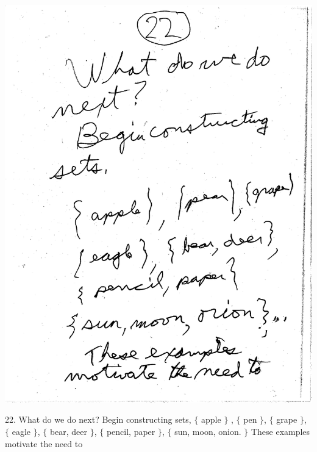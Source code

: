 \documentclass[10pt,a4paper]{article}
\begin{document}
\vspace{.20 in}

\includegraphics[scale=.5]{Pages/Page_22}

22. What do we do next? Begin constructing sets, $\{$ apple $\}$ , $\{$ pen $\}$, $\{$ grape $\}$, $\{$ eagle $\}$, $\{$ bear, deer $\}$, $\{$ pencil, paper $\}$, $\{$ sun, moon, onion. $\}$ These examples motivate the need to

\vspace{.20 in}
\end{document}
